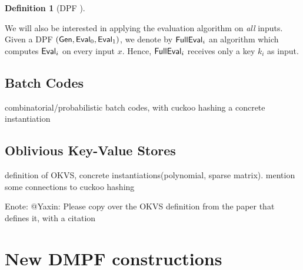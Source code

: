 \documentclass[sigconf]{acmart}
\newcommand{\Enote}[1]{\color{purple}Enote: #1\color{black}}
\newcommand{\Gen}{{\sf Gen}}
\newcommand{\Eval}{{\sf Eval}}
\newcommand{\FullEval}{{\sf FullEval}}
\newcommand{\Adv}{{\sf Adv}}
\newtheorem{definition}[theorem]{Definition}
\begin{document}
\begin{definition}[DPF \cite{EC:GilIsh14,CCS:BoyGilIsh16}]
\begin{itemize}
\end{itemize}
\end{definition}
 
 We will also be interested in applying the evaluation algorithm on \emph{all} inputs. Given a DPF $(\Gen,\Eval_0,\Eval_1)$, we denote by $\FullEval_i$ an algorithm which computes $\Eval_i$ on every input $x$. Hence, $\FullEval_i$ receives only a key $k_i$ as input.



\subsection{Batch Codes}
combinatorial/probabilistic batch codes, with cuckoo hashing a concrete instantiation

\subsection{Oblivious Key-Value Stores}
definition of OKVS, concrete instantiations(polynomial, sparse matrix). mention some connections to cuckoo hashing

\Enote{@Yaxin: Please copy over the OKVS definition from the paper that defines it, with a citation}





\section{New DMPF constructions}
\end{document}
